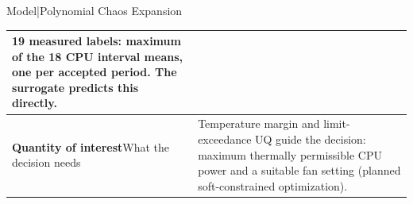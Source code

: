 \begin{frame}{Model\enspace|\enspace Polynomial Chaos Expansion}
{\begin{tabular}{@{}p{}p{}@{}}
      19 measured labels: maximum of the 18 CPU interval means,
      one per accepted period. The surrogate predicts this directly.\\
    \midrule
    \textbf{Quantity of interest}\newline What the decision needs &
      Temperature margin and limit-exceedance UQ guide the decision:
      maximum thermally permissible CPU power and a suitable fan setting
      (planned soft-constrained optimization).\\
    \bottomrule
  \end{tabular}
  }
\end{frame}

